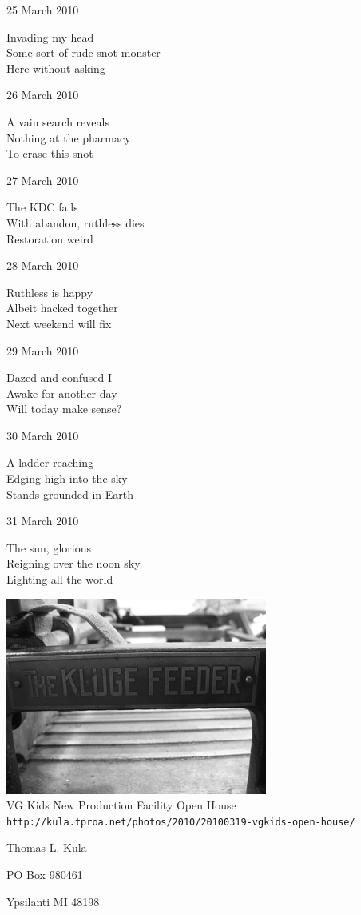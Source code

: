 \documentclass[12pt]{article}
\begin{document}
\newpage

25 March 2010

Invading my head \\
Some sort of rude snot monster \\
Here without asking

26 March 2010

A vain search reveals \\
Nothing at the pharmacy \\
To erase this snot

27 March 2010

The KDC fails \\
With abandon, ruthless dies \\
Restoration weird

28 March 2010

Ruthless is happy \\
Albeit hacked together \\
Next weekend will fix

29 March 2010

Dazed and confused I \\
Awake for another day \\
Will today make sense?

30 March 2010

A ladder reaching \\
Edging high into the sky \\
Stands grounded in Earth

31 March 2010

The sun, glorious \\
Reigning over the noon sky \\
Lighting all the world


\newpage

\begin{center}
\includegraphics{vgkids-open-house.jpg} \\[1cm]

VG Kids New Production Facility Open House \\
\small{{\tt http://kula.tproa.net/photos/2010/20100319-vgkids-open-house/ }}

\end{center}

\newpage

\thispagestyle{empty}
\vspace*{14cm}
\begin{sideways}
\Large{Thomas L. Kula}
\end{sideways}
\begin{sideways}
\Large{PO Box 980461}
\end{sideways}
\begin{sideways}
\Large{Ypsilanti MI 48198}
\end{sideways}
\end{document}
